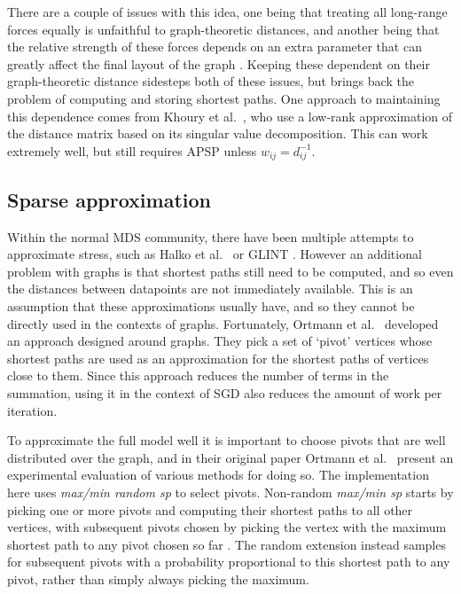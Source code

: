 There are a couple of issues with this idea, one being that treating all long-range forces equally is unfaithful to
graph-theoretic distances,
and another being that the relative strength of these forces depends on an extra parameter that can greatly affect the final layout of the graph \cite{Hu2005}.
Keeping these dependent on their graph-theoretic distance sidesteps both of these issues, but brings back the problem of computing and storing shortest paths. One approach to maintaining this dependence comes from Khoury et al.\ \cite{Khoury2012}, who use a low-rank approximation of the distance matrix based on its singular value decomposition. This can work extremely well, but still requires APSP unless $w_{ij} = d_{ij}^{-1}$.

\subsection{Sparse approximation}
\label{sec:sparse_explanation}
Within the normal MDS community, there have been multiple attempts to approximate stress, such as Halko et al.\ \cite{Halko2011} or GLINT \cite{Ingram2012}. However an additional problem with graphs is that shortest paths still need to be computed, and so even the distances between datapoints are not immediately available. This is an assumption that these approximations usually have, and so they cannot be directly used in the contexts of graphs.
Fortunately, Ortmann et al.\ \cite{Ortmann2017} developed an approach designed around graphs. They pick a set of `pivot' vertices whose shortest paths are used as an approximation for the shortest paths of vertices close to them.
Since this approach reduces the number of terms in the summation, using it in the context of SGD also reduces the amount of work per iteration.

To approximate the full model well it is important to choose pivots that are well distributed over the graph, and in their original paper Ortmann et al.\ \cite{Ortmann2017} present an experimental evaluation of various methods for doing so. The implementation here uses \textit{max/min random sp} to select pivots.
Non-random \textit{max/min sp} starts by picking one or more pivots and computing their shortest paths to all other vertices, with subsequent pivots chosen by picking the vertex with the maximum shortest path to any pivot chosen so far \cite{DeSilva2004}. The random extension instead samples for subsequent pivots with a probability proportional to this shortest path to any pivot, rather than simply always picking the maximum.

